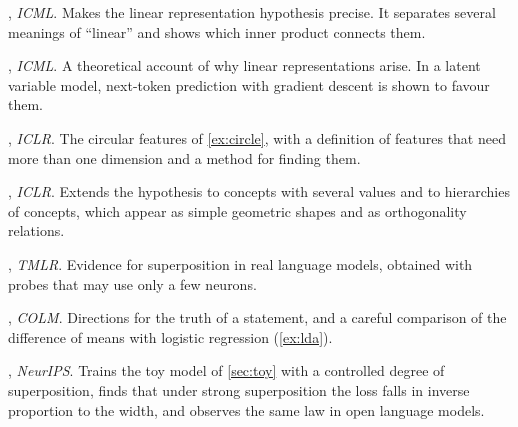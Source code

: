 \begin{readinglist}
\item \citet{park2024linear}, \emph{ICML}. Makes the linear representation hypothesis precise. It separates
several meanings of ``linear'' and shows which inner product connects them.
\item \citet{jiang2024origins}, \emph{ICML}. A theoretical account of why linear representations arise. In a latent
variable model, next-token prediction with gradient descent is shown to favour them.
\item \citet{engels2025not}, \emph{ICLR}. The circular features of \cref{ex:circle}, with a definition of
features that need more than one dimension and a method for finding them.
\item \citet{park2025geometry}, \emph{ICLR}. Extends the hypothesis to concepts with several values and to
hierarchies of concepts, which appear as simple geometric shapes and as orthogonality relations.
\item \citet{gurnee2023finding}, \emph{TMLR}. Evidence for superposition in real language models, obtained with
probes that may use only a few neurons.
\item \citet{marks2024geometry}, \emph{COLM}. Directions for the truth of a statement, and a careful comparison of
the difference of means with logistic regression (\cref{ex:lda}).
\item \citet{liu2025superposition}, \emph{NeurIPS}. Trains the toy model of \cref{sec:toy} with a controlled degree
of superposition, finds that under strong superposition the loss falls in inverse proportion to the width, and
observes the same law in open language models.
\end{readinglist}
